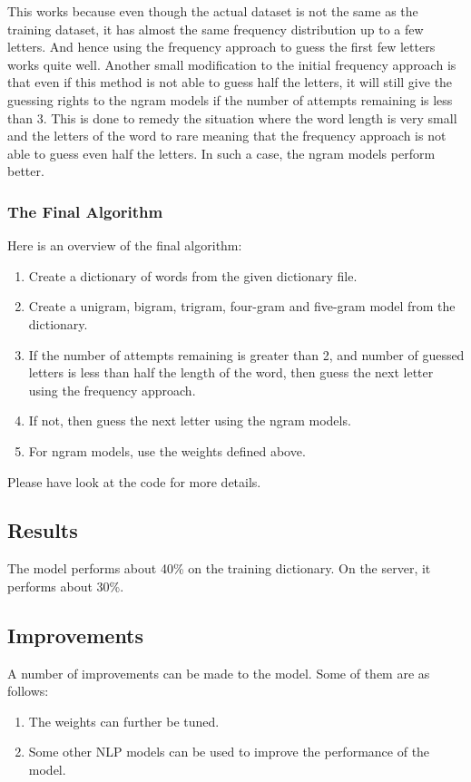 \documentclass[12pt]{article}
\begin{document}
This works because even though the actual dataset is not the same as the training dataset, it has almost the same frequency distribution up to a few letters. And hence using the frequency approach to guess the first few letters works quite well. Another small modification to the initial frequency approach is that even if this method is not able to guess half the letters, it will still give the guessing rights to the ngram models if the number of attempts remaining is less than 3. This is done to remedy the situation where the word length is very small and the letters of the word to rare meaning that the frequency approach is not able to guess even half the letters. In such a case, the ngram models perform better.

\subsubsection{The Final Algorithm}
Here is an overview of the final algorithm:

\begin{enumerate}
    \item Create a dictionary of words from the given dictionary file.
    \item Create a unigram, bigram, trigram, four-gram and five-gram model from the dictionary.
    \item If the number of attempts remaining is greater than 2, and number of guessed letters is less than half the length of the word, then guess the next letter using the frequency approach.
    \item If not, then guess the next letter using the ngram models.
    \item For ngram models, use the weights defined above.
\end{enumerate}

Please have look at the code for more details.

\subsection{Results}
The model performs about 40\% on the training dictionary. On the server, it performs about 30\%.

\subsection{Improvements}
A number of improvements can be made to the model. Some of them are as follows:
\begin{enumerate}
    \item The weights can further be tuned.
    \item Some other NLP models can be used to improve the performance of the model.
\end{enumerate}
\end{document}
